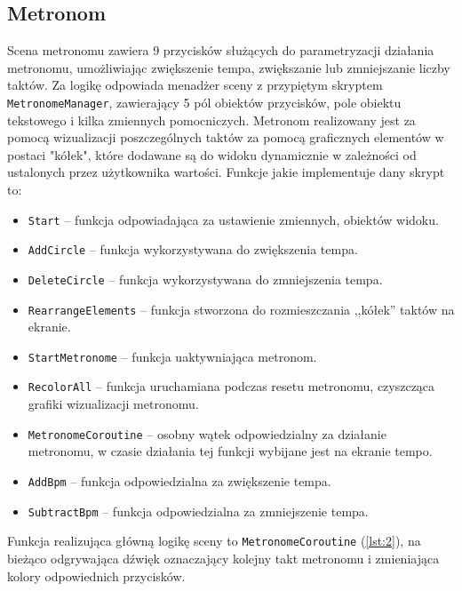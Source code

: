 \subsection{Metronom}

Scena metronomu zawiera 9 przycisków służących do parametryzacji działania metronomu, umożliwiając zwiększenie tempa, zwiększanie lub zmniejszanie liczby taktów. Za logikę odpowiada menadżer sceny z przypiętym skryptem \texttt{MetronomeManager}, zawierający 5 pól obiektów przycisków, pole obiektu tekstowego i kilka zmiennych pomocniczych. Metronom realizowany jest za pomocą wizualizacji poszczególnych taktów za pomocą graficznych elementów w postaci "kółek", które dodawane są do widoku dynamicznie w zależności od ustalonych przez użytkownika wartości. Funkcje jakie implementuje dany skrypt to:

\begin{itemize}
    \item \texttt{Start} -- funkcja odpowiadająca za ustawienie zmiennych, obiektów widoku. 
    \item \texttt{AddCircle} -- funkcja wykorzystywana do zwiększenia tempa.
    \item \texttt{DeleteCircle} -- funkcja wykorzystywana do zmniejszenia tempa.
    \item \texttt{RearrangeElements} -- funkcja stworzona do rozmieszczania ,,kółek'' taktów na ekranie.
    \item \texttt{StartMetronome} -- funkcja uaktywniająca metronom.
    \item \texttt{RecolorAll} -- funkcja uruchamiana podczas resetu metronomu, czyszcząca grafiki wizualizacji metronomu.
    \item \texttt{MetronomeCoroutine} -- osobny wątek odpowiedzialny za działanie metronomu, w czasie działania tej funkcji wybijane jest na ekranie tempo.
    \item \texttt{AddBpm} -- funkcja odpowiedzialna za zwiększenie tempa.
    \item \texttt{SubtractBpm} -- funkcja odpowiedzialna za zmniejszenie tempa.
\end{itemize}

Funkcja realizująca główną logikę sceny to \texttt{MetronomeCoroutine} (\ref{lst:2}), na bieżąco odgrywająca dźwięk oznaczający kolejny takt metronomu i zmieniająca kolory odpowiednich przycisków.


